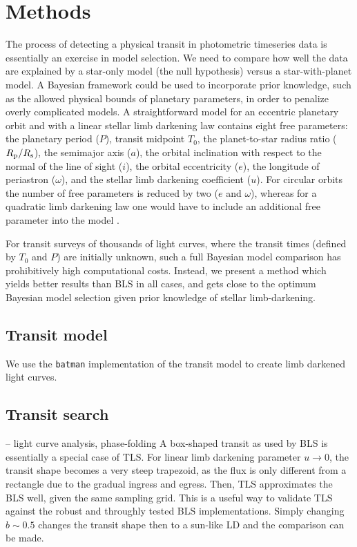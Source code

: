 \documentclass[twocolumn,tighten,longauthor]{myaastex62}
\begin{document}
\section{Methods}
The process of detecting a physical transit in photometric timeseries data is essentially an exercise in model selection. We need to compare how well the data are explained by a star-only model (the null hypothesis) versus a star-with-planet model. A Bayesian framework could be used to incorporate prior knowledge, such as the allowed physical bounds of planetary parameters, in order to penalize overly complicated models. A straightforward model  for an eccentric planetary orbit and with a linear stellar limb darkening law contains eight free parameters: the planetary period ($P$), transit midpoint $T_0$, the planet-to-star radius ratio ($R_{\rm p}/R_{\rm s}$), the semimajor axis ($a$), the orbital inclination with respect to the normal of the line of sight ($i$), the orbital eccentricity ($e$), the longitude of periastron ($\omega$), and the stellar limb darkening coefficient ($u$). For circular orbits the number of free parameters is reduced by two ($e$ and $\omega$), whereas for a quadratic limb darkening law one would have to include an additional free parameter into the model \citep[replacing $u$ with $u_1$ and $u_2$]{2000A&A...363.1081C}.

For transit surveys of thousands of light curves, where the transit times (defined by $T_0$ and $P$) are initially unknown, such a full Bayesian model comparison has prohibitively high computational costs. Instead, we present a method which yields better results than BLS in all cases, and gets close to the optimum Bayesian model selection given prior knowledge of stellar limb-darkening.


\subsection{Transit model}
We use the \texttt{batman} implementation \citep{2015PASP..127.1161K,2015ascl.soft10002K} of the \cite{2002ApJ...580L.171M} transit model to create limb darkened light curves.


\subsection{Transit search}
– light curve analysis, phase-folding
A box-shaped transit as used by BLS is essentially a special case of TLS. For linear limb darkening parameter $u \rightarrow 0$, the transit shape becomes a very steep trapezoid, as the flux is only different from a rectangle due to the gradual ingress and egress. Then, TLS approximates the BLS well, given the same sampling grid. This is a useful way to validate TLS against the robust and throughly tested BLS implementations. Simply changing $b\sim0.5$ changes the transit shape then to a sun-like LD and the comparison can be made.
\end{document}
